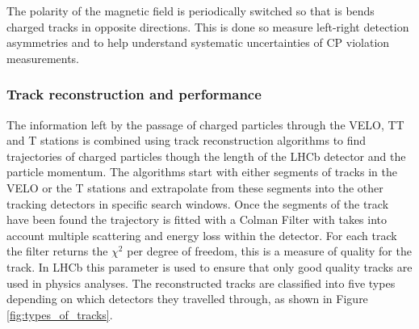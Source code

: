 The polarity of the magnetic field is periodically switched so that is bends charged tracks in opposite directions. This is done so measure left-right detection asymmetries and to help understand systematic uncertainties of CP violation measurements. %



\subsubsection{Track reconstruction and performance}
\label{sec:Track_recon}


The information left by the passage of charged particles through the VELO, TT and T stations is combined using track reconstruction algorithms to find trajectories of charged particles though the length of the LHCb detector and the particle momentum.  
The algorithms start with either segments of tracks in the VELO or the T stations and extrapolate from these segments into the other tracking detectors in specific search windows. 
Once the segments of the track have been found the trajectory is fitted with a Colman Filter with takes into account multiple scattering and energy loss within the detector. For each track the filter returns the $\chi^{2}$ per degree of freedom, this is a measure of quality for the track. In LHCb this parameter is used to ensure that only good quality tracks are used in physics analyses. 
The reconstructed tracks are classified into five types depending on which detectors they travelled through, as shown in Figure \ref{fig:types_of_tracks}.



